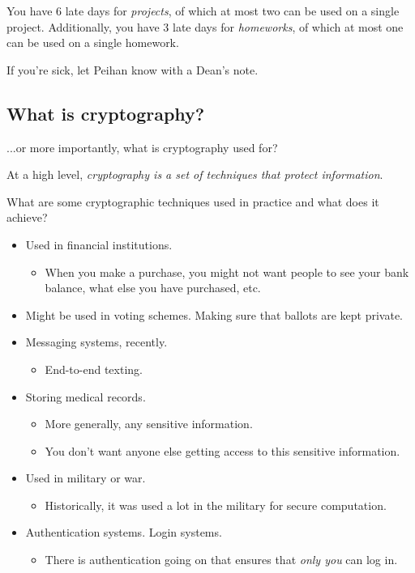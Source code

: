 You have 6 late days for \emph{projects}, of which at most two can be used on a single project. Additionally, you have 3 late days for \emph{homeworks}, of which at most one can be used on a single homework.

If you're sick, let Peihan know with a Dean's note.

\subsection{What is cryptography?}
...or more importantly, what is cryptography used for?

At a high level, \emph{cryptography is a set of techniques that protect information}.

\begin{ques*}
    What are some cryptographic techniques used in practice and what does it achieve?
\end{ques*}
\begin{itemize}
    \item Used in financial institutions.
          \begin{itemize}
              \item When you make a purchase, you might not want people to see your bank balance, what else you have purchased, etc.
          \end{itemize}
    \item Might be used in voting schemes. Making sure that ballots are kept private.
    \item Messaging systems, recently.
          \begin{itemize}
              \item End-to-end texting.
          \end{itemize}
    \item Storing medical records.
          \begin{itemize}
              \item More generally, any sensitive information.
              \item You don't want anyone else getting access to this sensitive information.
          \end{itemize}
    \item Used in military or war.
          \begin{itemize}
              \item Historically, it was used a lot in the military for secure computation.
          \end{itemize}
    \item Authentication systems. Login systems.
          \begin{itemize}
              \item There is authentication going on that ensures that \emph{only you} can log in.
          \end{itemize}
\end{itemize}

